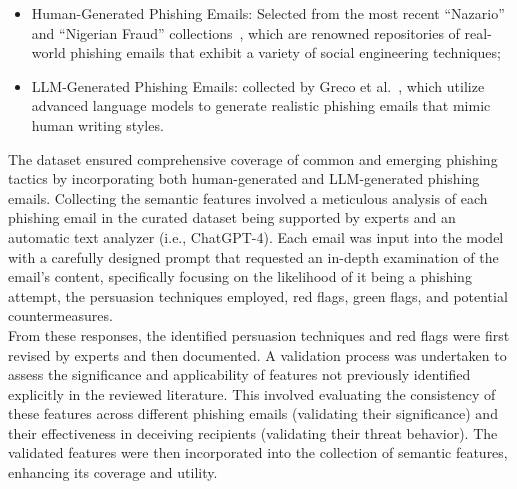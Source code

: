 \begin{itemize}
    \item Human-Generated Phishing Emails: Selected from the most recent ``Nazario'' and ``Nigerian Fraud'' collections~\cite{b33}, which are renowned repositories of real-world phishing emails that exhibit a variety of social engineering techniques;
    \item LLM-Generated Phishing Emails: collected by Greco et al.~\cite{b24}, which utilize advanced language models to generate realistic phishing emails that mimic human writing styles.
\end{itemize}

The dataset ensured comprehensive coverage of common and emerging phishing tactics by incorporating both human-generated and LLM-generated phishing emails.
Collecting the semantic features involved a meticulous analysis of each phishing email in the curated dataset being supported by experts and an automatic text analyzer (i.e., ChatGPT-4). Each email was input into the model with a carefully designed prompt that requested an in-depth examination of the email’s content, specifically focusing on the likelihood of it being a phishing attempt, the persuasion techniques employed, red flags, green flags, and potential countermeasures.
\\
From these responses, the identified persuasion techniques and red flags were first revised by experts and then documented. A validation process was undertaken to assess the significance and applicability of features not previously identified explicitly in the reviewed literature. This involved evaluating the consistency of these features across different phishing emails (validating their significance) and their effectiveness in deceiving recipients (validating their threat behavior). The validated features were then incorporated into the collection of semantic features, enhancing its coverage and utility. 

